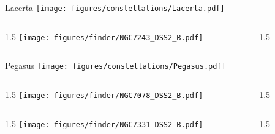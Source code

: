 \documentclass[final]{beamer}
\newlength{\colwidth}
\begin{document}

\begin{frame}[t]{\LARGE Lacerta}
  \centering
  \texttt{[image: figures/constellations/Lacerta.pdf]}
\end{frame}


\begin{frame}[t]{}
  \begin{columns}[T]
    \begin{column}{1.5\colwidth}
      \centering
      \texttt{[image: figures/finder/NGC7243\_DSS2\_B.pdf]}
    \end{column}
    \begin{column}{1.5\colwidth}
      \Large
      
    \end{column}
  \end{columns}
  \vspace{\fill}
\end{frame}


\begin{frame}[t]{\LARGE Pegasus}
  \centering
  \texttt{[image: figures/constellations/Pegasus.pdf]}
\end{frame}


\begin{frame}[t]{}
  \begin{columns}[T]
    \begin{column}{1.5\colwidth}
      \centering
      \texttt{[image: figures/finder/NGC7078\_DSS2\_B.pdf]}
    \end{column}
    \begin{column}{1.5\colwidth}
      \Large
      
    \end{column}
  \end{columns}
  \vspace{\fill}
  \begin{columns}[T]
    \begin{column}{1.5\colwidth}
      \centering
      \texttt{[image: figures/finder/NGC7331\_DSS2\_B.pdf]}
    \end{column}
    \begin{column}{1.5\colwidth}
      \Large
      
    \end{column}
  \end{columns}
\end{frame}
\end{document}
